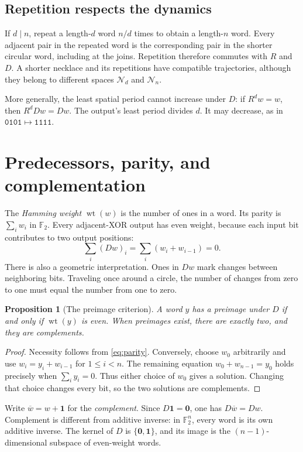 \documentclass[11pt]{article}
\newtheorem{proposition}{Proposition}[section]
\theoremstyle{definition}
\newcommand{\F}{\mathbb F_2}
\newcommand{\one}{\mathbf 1}
\newcommand{\zero}{\mathbf 0}
\newcommand{\word}[1]{\mathtt{#1}}
\DeclareMathOperator{\wt}{wt}
\numberwithin{equation}{section}
\begin{document}
\subsection{Repetition respects the dynamics}

If $d\mid n$, repeat a length-$d$ word $n/d$ times to obtain a
length-$n$ word. Every adjacent pair in the repeated word is the
corresponding pair in the shorter circular word, including at the
joins. Repetition therefore commutes with $R$ and $D$. A shorter
necklace and its repetitions have compatible trajectories, although
they belong to different spaces $\mathcal N_d$ and $\mathcal N_n$.

More generally, the least spatial period cannot increase under $D$:
if $R^dw=w$, then $R^dDw=Dw$. The output's least period divides $d$.
It may decrease, as in $\word{0101}\mapsto\word{1111}$.

\section{Predecessors, parity, and complementation}\label{sec:preimages}

The \emph{Hamming weight} $\wt(w)$ is the number of ones in a word.
Its parity is $\sum_iw_i$ in $\F$. Every adjacent-XOR output has
even weight, because each input bit contributes to two output positions:
\begin{equation}\label{eq:parity}
 \sum_i(Dw)_i=\sum_i(w_i+w_{i-1})=0.
\end{equation}
There is also a geometric interpretation. Ones in $Dw$ mark changes
between neighboring bits. Traveling once around a circle, the number
of changes from zero to one must equal the number from one to zero.

\begin{proposition}[The preimage criterion]\label{prop:preimages}
A word $y$ has a preimage under $D$ if and only if $\wt(y)$ is even.
When preimages exist, there are exactly two, and they are complements.
\end{proposition}
\begin{proof}
Necessity follows from \eqref{eq:parity}. Conversely, choose $w_0$
arbitrarily and use $w_i=y_i+w_{i-1}$ for $1\le i<n$. The remaining
equation $w_0+w_{n-1}=y_0$ holds precisely when $\sum_i y_i=0$.
Thus either choice of $w_0$ gives a solution. Changing that choice
changes every bit, so the two solutions are complements.
\end{proof}

Write $\overline w=w+\one$ for the \emph{complement}. Since
$D\one=\zero$, one has $D\overline w=Dw$. Complement is different
from additive inverse: in $\F^n$, every word is its own additive
inverse. The kernel of $D$ is $\{\zero,\one\}$, and its image is
the $(n-1)$-dimensional subspace of even-weight words.
\end{document}
